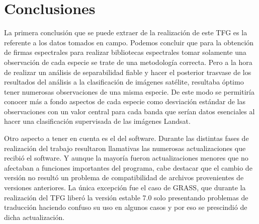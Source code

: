 


\chapter{Conclusiones}

La primera conclusión que se puede extraer de la realización de este \ac{TFG} es la referente a los datos tomados en campo. Podemos concluir que para la obtención de firmas espectrales para realizar bibliotecas espectrales tomar solamente una observación de cada especie se trate de una metodología correcta. Pero a la hora de realizar un análisis de separabilidad fiable y hacer el posterior trasvase de los resultados del análisis a la clasificación de imágenes satélite, resultaba óptimo tener numerosas observaciones de una misma especie. De este modo se permitiría conocer más a fondo aspectos de cada especie como desviación estándar de las observaciones con un valor central para cada banda que serían datos esenciales al hacer una clasificación supervisada de las imágenes Landsat.\Sep

Otro aspecto a tener en cuenta es el del software. Durante las distintas fases de realización del trabajo resultaron llamativas las numerosas actualizaciones que recibió el software. Y aunque la mayoría fueron actualizaciones menores que no afectaban a funciones importantes del programa, cabe destacar que el cambio de versión no resultó un problema de compatibilidad de archivos provenientes de versiones anteriores. La única excepción fue el caso de GRASS, que durante la realización del \ac{TFG} liberó la versión estable 7.0 solo presentando problemas de traducción haciendo confuso su uso en algunos casos y por eso se prescindió de dicha actualización.\Sep
